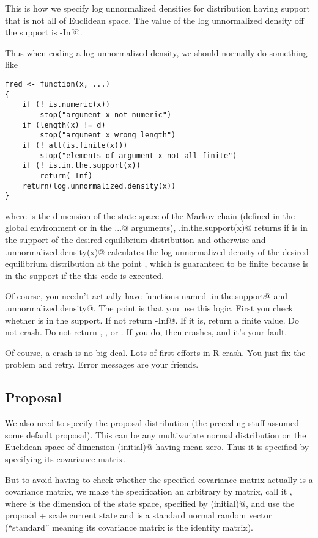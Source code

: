 \documentclass{article}
\begin{document}
This is how we specify log unnormalized densities for distribution
having support that is not all of Euclidean space.  The value
of the log unnormalized density off the support is \verb@-Inf@.

Thus when coding a log unnormalized density, we should normally do
something like
\begin{verbatim}
fred <- function(x, ...)
{
    if (! is.numeric(x))
        stop("argument x not numeric")
    if (length(x) != d)
        stop("argument x wrong length")
    if (! all(is.finite(x)))
        stop("elements of argument x not all finite")
    if (! is.in.the.support(x))
        return(-Inf)
    return(log.unnormalized.density(x))
}
\end{verbatim}
where \verb@d@ is the dimension of the state space of the Markov chain
(defined in the global environment or in the \verb@...@ arguments),
\verb@is.in.the.support(x)@ returns
\verb@TRUE@ if \verb@x@ is in the support of the desired equilibrium
distribution and \verb@FALSE@ otherwise and \verb@log.unnormalized.density(x)@
calculates the log unnormalized density of the desired equilibrium
distribution at the point \verb@x@, which
is guaranteed to be finite because \verb@x@ is in the support if the
this code is executed.

Of course, you needn't actually have functions named
\verb@is.in.the.support@ and \verb@log.unnormalized.density@.
The point is that you use this logic.  First you check
whether \verb@x@ is in the support.  If not return \verb@-Inf@.
If it is, return a finite value.  Do not crash.  Do not return
\verb@NA@, \verb@NaN@, or \verb@Inf@.  If you do, then \verb@metrop@
crashes, and it's your fault.

Of course, a crash is no big deal.  Lots of first efforts in R crash.
You just fix the problem and retry.  Error messages are your friends.

\subsection{Proposal}

We also need to specify the proposal distribution (the preceding stuff
assumed some default proposal).  This can be any multivariate normal
distribution on the Euclidean space of dimension \verb@length(initial)@
having mean zero.  Thus it is specified by specifying its covariance
matrix.

But to avoid having to check whether the specified covariance
matrix actually is a covariance matrix, we make the specification
an arbitrary \verb@d@ by \verb@d@ matrix, call it \verb@scale@,
where \verb@d@ is the dimension of the state space, specified by
\verb@length(initial)@, 
and use the proposal \verb@x + scale %*% z@, where \verb@x@ is the
current state and \verb@z@ is a standard normal random vector
(``standard'' meaning its covariance matrix is the identity matrix).
\end{document}
